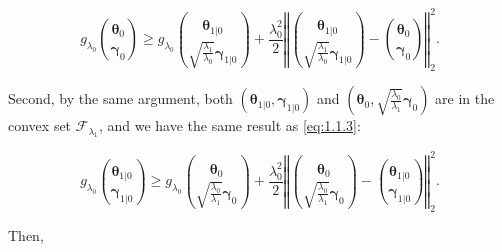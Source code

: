 \begin{equation}
    \label{eq:1.1.3}
    g_{\lambda_0}\binom{\boldsymbol\theta_{0}}{\boldsymbol\gamma_{0}}\geq g_{\lambda_0}\binom{\boldsymbol\theta_{1|0}}{\sqrt{\frac{\lambda_1}{\lambda_0}}\boldsymbol\gamma_{1|0}}+\frac{\lambda_0^2}{2}\left\Vert\binom{\boldsymbol\theta_{1|0}}{\sqrt{\frac{\lambda_1}{\lambda_0}}\boldsymbol\gamma_{1|0}}-\binom{\boldsymbol\theta_{0}}{\boldsymbol\gamma_{0}}\right\Vert_2^2.
\end{equation}

Second, by the same argument, both $(\boldsymbol\theta_{1|0},\boldsymbol\gamma_{1|0})$ and $\left(\boldsymbol\theta_{0},\sqrt{\frac{\lambda_0}{\lambda_1}}\boldsymbol\gamma_{0}\right)$ are in the convex set $\mathcal{F}_{\lambda_1}$, and we have the same result as \eqref{eq:1.1.3}:

\begin{equation}
    \label{eq:1.1.4}
    g_{\lambda_0}\binom{\boldsymbol\theta_{1|0}}{\boldsymbol\gamma_{1|0}}\geq g_{\lambda_0}\binom{\boldsymbol\theta_{0}}{\sqrt{\frac{\lambda_0}{\lambda_1}}\boldsymbol\gamma_{0}}+\frac{\lambda_0^2}{2}\left\Vert\binom{\boldsymbol\theta_{0}}{\sqrt{\frac{\lambda_0}{\lambda_1}}\boldsymbol\gamma_{0}}-\binom{\boldsymbol\theta_{1|0}}{\boldsymbol\gamma_{1|0}}\right\Vert_2^2.
\end{equation}

Then,


